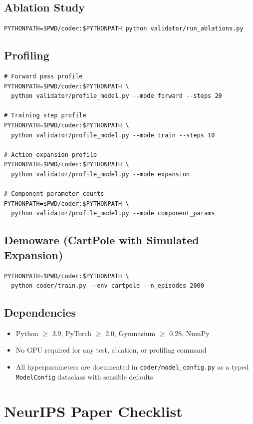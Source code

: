 \documentclass{article}
\begin{document}
\subsection{Ablation Study}
\begin{verbatim}
PYTHONPATH=$PWD/coder:$PYTHONPATH python validator/run_ablations.py
\end{verbatim}

\subsection{Profiling}
\begin{verbatim}
# Forward pass profile
PYTHONPATH=$PWD/coder:$PYTHONPATH \
  python validator/profile_model.py --mode forward --steps 20

# Training step profile
PYTHONPATH=$PWD/coder:$PYTHONPATH \
  python validator/profile_model.py --mode train --steps 10

# Action expansion profile
PYTHONPATH=$PWD/coder:$PYTHONPATH \
  python validator/profile_model.py --mode expansion

# Component parameter counts
PYTHONPATH=$PWD/coder:$PYTHONPATH \
  python validator/profile_model.py --mode component_params
\end{verbatim}

\subsection{Demoware (CartPole with Simulated Expansion)}
\begin{verbatim}
PYTHONPATH=$PWD/coder:$PYTHONPATH \
  python coder/train.py --env cartpole --n_episodes 2000
\end{verbatim}

\subsection{Dependencies}
\begin{itemize}
  \item Python $\geq$ 3.9, PyTorch $\geq$ 2.0, Gymnasium $\geq$ 0.28, NumPy
  \item No GPU required for any test, ablation, or profiling command
  \item All hyperparameters are documented in \texttt{coder/model\_config.py}
  as a typed \texttt{ModelConfig} dataclass with sensible defaults
\end{itemize}


\newpage
\section*{NeurIPS Paper Checklist}
\end{document}
